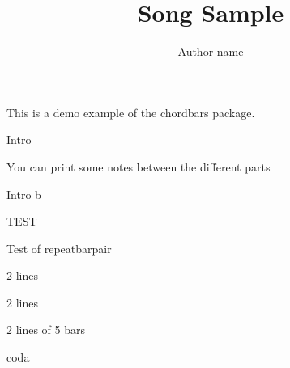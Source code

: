 \documentclass[11pt]{article}
\title{Song Sample}
\author{Author name}
\begin{document}
\bpbthree

\countbarsYes

\songtitle

This is a demo example of the chordbars package.


\begin{chordbar}{4}{Intro}
\repeatBarPair
\end{chordbar}

You can print some notes between the different parts

\def\barsize{2}%

\begin{chordbar}[3]{6}{Intro b}
\repeatBar
{}
\end{chordbar}


\def\barsize{1.4}%
\begin{chordbar}[2]{4}{TEST}
\repeatBar
\end{chordbar}

\begin{chordbar}{5}{Test of repeatbarpair}
\repeatBarPair
{}
\end{chordbar}


\begin{chordbar}[2]{6}{2 lines}
\repeatBar
{}
\repeatBar
\end{chordbar}

\begin{chordbar}[4]{11}{2 lines}
\newchordline
{}
\repeatBar
\end{chordbar}

\begin{chordbar}[2]{10}{2 lines of 5 bars}
\newchordline
{}
\repeatBar
\end{chordbar}


\begin{chordbar}[2]{11}{coda}
\end{chordbar}


\printNbBars
\end{document}
